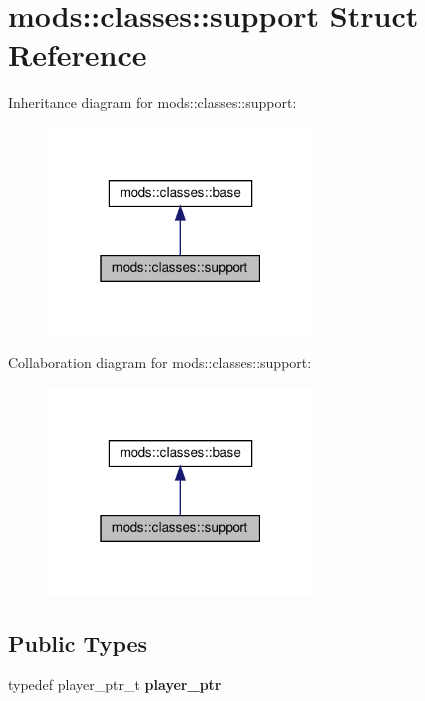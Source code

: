 \hypertarget{structmods_1_1classes_1_1support}{}\section{mods\+:\+:classes\+:\+:support Struct Reference}
\label{structmods_1_1classes_1_1support}


Inheritance diagram for mods\+:\+:classes\+:\+:support\+:
\nopagebreak
\begin{figure}[H]
\begin{center}
\leavevmode
\includegraphics[width=199pt]{structmods_1_1classes_1_1support__inherit__graph}
\end{center}
\end{figure}


Collaboration diagram for mods\+:\+:classes\+:\+:support\+:
\nopagebreak
\begin{figure}[H]
\begin{center}
\leavevmode
\includegraphics[width=199pt]{structmods_1_1classes_1_1support__coll__graph}
\end{center}
\end{figure}
\subsection*{Public Types}
\begin{DoxyCompactItemize}
\item 
\mbox{\label{structmods_1_1classes_1_1support_a444b4bb82cfcf5c62669b40c4b3e4d79}} 
typedef player\+\_\+ptr\+\_\+t {\bfseries player\+\_\+ptr}
\end{DoxyCompactItemize}
